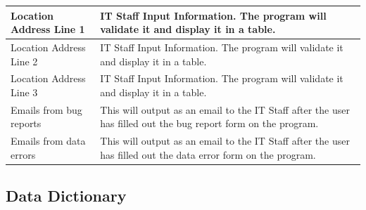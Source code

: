 \begin{center}
\begin{longtable}{|p{5cm}|p{5cm}|}
	Location Address Line 1 & IT Staff Input Information. The program will validate it and display it in a table. \\ \hline
	Location Address Line 2 & IT Staff Input Information. The program will validate it and display it in a table. \\ \hline
	Location Address Line 3 & IT Staff Input Information. The program will validate it and display it in a table. \\ \hline
	Emails from bug reports & This will output as an email to the IT Staff after the user has filled out the bug report form on the program. \\ \hline
	Emails from data errors & This will output as an email to the IT Staff after the user has filled out the data error form on the program. \\ \hline
    \end{longtable}
\end{center}

\newpage

\subsection{Data Dictionary}

